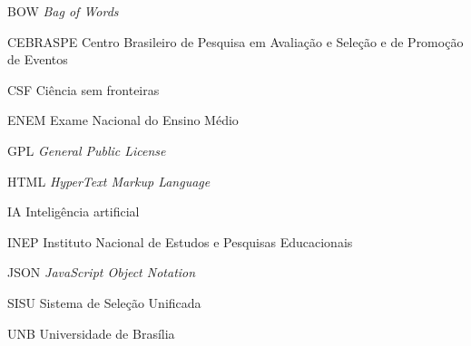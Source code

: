 \begin{basedescript}{\desclabelstyle{\pushlabel}\desclabelwidth{6em}}
\item[{BOW}] \textit{Bag of Words}%
\item[{CEBRASPE}] Centro Brasileiro de Pesquisa em Avaliação e Seleção e de Promoção de Eventos%
\item[{CSF}] Ciência sem fronteiras%
\item[{ENEM}] Exame Nacional do Ensino Médio%
\item[{GPL}] \textit{General Public License} %
\item[{HTML}] \textit{HyperText Markup Language}%
\item[{IA}] Inteligência artificial%
\item[{INEP}] Instituto Nacional de Estudos e Pesquisas Educacionais%
\item[{JSON}] \textit{JavaScript Object Notation}%
\item[{SISU}] Sistema de Seleção Unificada%
\item[{UNB}] Universidade de Brasília%
\end{basedescript}